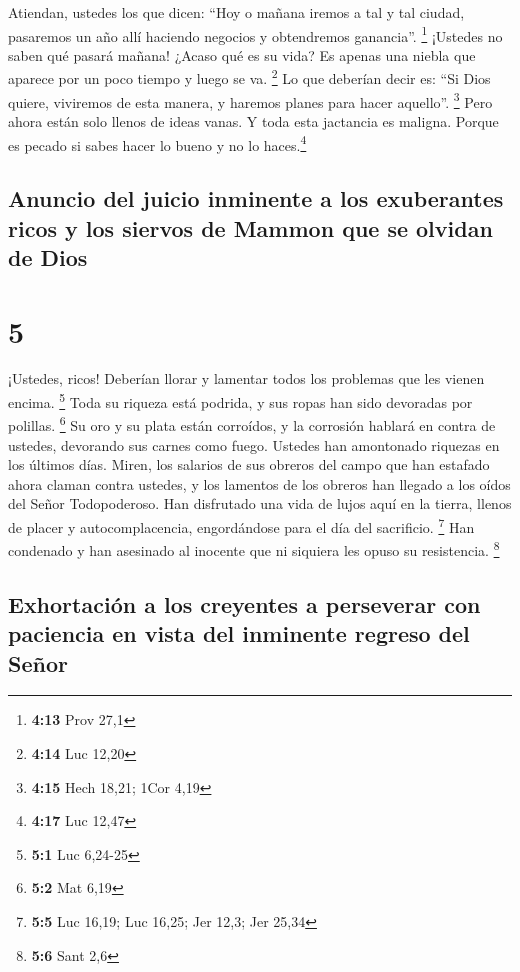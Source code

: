  Atiendan, ustedes los que dicen: ``Hoy o mañana iremos a
tal y tal ciudad, pasaremos un año allí haciendo negocios y obtendremos
ganancia''. \footnote{\textbf{4:13} Prov 27,1}  ¡Ustedes
no saben qué pasará mañana! ¿Acaso qué es su vida? Es apenas una niebla
que aparece por un poco tiempo y luego se va. \footnote{\textbf{4:14}
  Luc 12,20}  Lo que deberían decir es: ``Si Dios quiere,
viviremos de esta manera, y haremos planes para hacer aquello''.
\footnote{\textbf{4:15} Hech 18,21; 1Cor 4,19}  Pero
ahora están solo llenos de ideas vanas. Y toda esta jactancia es
maligna.  Porque es pecado si sabes hacer lo bueno y no
lo haces.\footnote{\textbf{4:17} Luc 12,47}

\hypertarget{anuncio-del-juicio-inminente-a-los-exuberantes-ricos-y-los-siervos-de-mammon-que-se-olvidan-de-dios}{%
\subsection{Anuncio del juicio inminente a los exuberantes ricos y los
siervos de Mammon que se olvidan de
Dios}\label{anuncio-del-juicio-inminente-a-los-exuberantes-ricos-y-los-siervos-de-mammon-que-se-olvidan-de-dios}}

\hypertarget{section-4}{%
\section{5}\label{section-4}}

 ¡Ustedes, ricos! Deberían llorar y lamentar todos los
problemas que les vienen encima. \footnote{\textbf{5:1} Luc 6,24-25}
 Toda su riqueza está podrida, y sus ropas han sido
devoradas por polillas. \footnote{\textbf{5:2} Mat 6,19} 
Su oro y su plata están corroídos, y la corrosión hablará en contra de
ustedes, devorando sus carnes como fuego. Ustedes han amontonado
riquezas en los últimos días.  Miren, los salarios de sus
obreros del campo que han estafado ahora claman contra ustedes, y los
lamentos de los obreros han llegado a los oídos del Señor Todopoderoso.
 Han disfrutado una vida de lujos aquí en la tierra,
llenos de placer y autocomplacencia, engordándose para el día del
sacrificio. \footnote{\textbf{5:5} Luc 16,19; Luc 16,25; Jer 12,3; Jer
  25,34}  Han condenado y han asesinado al inocente que ni
siquiera les opuso su resistencia. \footnote{\textbf{5:6} Sant 2,6}

\hypertarget{exhortaciuxf3n-a-los-creyentes-a-perseverar-con-paciencia-en-vista-del-inminente-regreso-del-seuxf1or}{%
\subsection{Exhortación a los creyentes a perseverar con paciencia en
vista del inminente regreso del
Señor}\label{exhortaciuxf3n-a-los-creyentes-a-perseverar-con-paciencia-en-vista-del-inminente-regreso-del-seuxf1or}}

